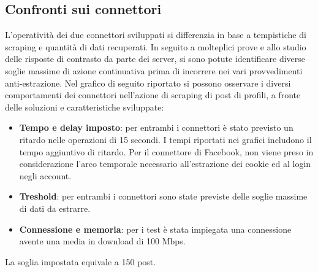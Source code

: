 \subsection{Confronti sui connettori}
L'operativit\`a dei due connettori sviluppati si differenzia in base a tempistiche di scraping e quantit\`a di dati recuperati.
In seguito a molteplici prove e allo studio delle risposte di contrasto da parte dei server, si sono potute identificare diverse soglie massime di azione continuativa prima di incorrere nei vari provvedimenti anti-estrazione.
Nel grafico di seguito riportato si possono osservare i diversi comportamenti dei connettori nell'azione di scraping di post di profili, a fronte delle soluzioni e caratteristiche sviluppate:
\begin{itemize}
    \item \textbf{Tempo e delay imposto}: per entrambi i connettori \`e stato previsto un ritardo nelle operazioni di 15 secondi. I tempi riportati nei grafici includono il tempo aggiuntivo di ritardo. Per il connettore di Facebook, non viene preso in considerazione l'arco temporale necessario all'estrazione dei cookie ed al login negli account.
    \item \textbf{Treshold}: per entrambi i connettori sono state previste delle soglie massime di dati da estrarre.
    \item \textbf{Connessione e memoria}: per i test \`e stata impiegata una connessione avente una media in download di 100 Mbps.
\end{itemize}
\begin{center}
\end{center}
La soglia impostata equivale a 150 post.

